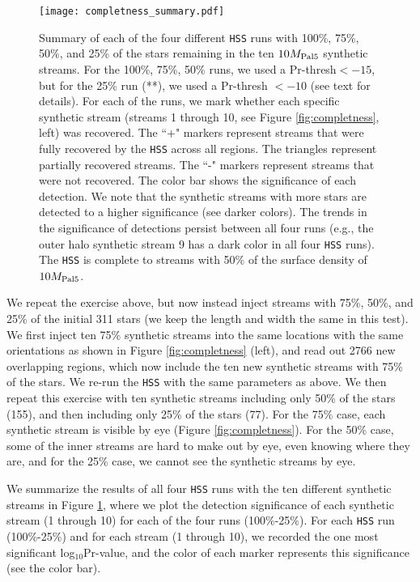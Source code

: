 \documentclass[twocolumn]{aastex631}
\begin{document}
\begin{figure}
\centerline{\texttt{[image: completness\_summary.pdf]}}
\caption{Summary of each of the four different \texttt{HSS} runs with 100\%, 75\%, 50\%, and 25\% of the stars remaining in the ten $10{M}_{\rm Pal 5}$ synthetic streams. For the 100\%, 75\%, 50\% runs, we used a Pr-thresh$<-15$, but for the 25\% run (**), we used a  Pr-thresh $<-10$ (see text for details). 
For each of the runs, we mark whether each specific synthetic stream (streams 1 through 10, see Figure \ref{fig:completness}, left) was recovered. The ``+" markers represent streams that were fully recovered by the \texttt{HSS} across all regions. The triangles represent partially recovered streams. The ``-" markers represent streams that were not recovered. The color bar shows the significance of each detection. 
We note that the synthetic streams with more stars are detected to a higher significance (see darker colors). The trends in the significance of detections persist between all four runs (e.g., the outer halo synthetic stream 9 has a dark color in all four \texttt{HSS} runs). The \texttt{HSS} is complete to streams with 50\% of the surface density of $10 {M}_{\rm Pal 5}$.
}
\label{fig:completness_summary}
\end{figure}
We repeat the exercise above, but now instead inject streams with 75\%, 50\%, and 25\% of the initial 311 stars (we keep the length and width the same in this test). We first inject ten 75\% synthetic  streams into the same locations with the same orientations as shown in  Figure \ref{fig:completness} (left), and read out 2766 new overlapping regions, which now include the ten new synthetic streams with 75\% of the stars. 
We re-run the \texttt{HSS} with the same parameters as above. We then repeat this exercise with ten synthetic streams including only 50\% of the stars (155), and then including only 25\% of the stars (77). For the 75\% case, each synthetic stream is visible by eye (Figure \ref{fig:completness}). For the 50\% case, some of the inner streams are hard to make out by eye, even knowing where they are, and for the 25\% case, we cannot see the synthetic streams by eye.


We summarize the results of all four \texttt{HSS} runs with the ten different synthetic streams in Figure \ref{fig:completness_summary}, where we plot the detection significance of each synthetic stream (1 through 10) for each of the four runs (100\%-25\%). For each \texttt{HSS} run (100\%-25\%) and for each stream (1 through 10), we recorded the one most significant log$_{10}$Pr-value, and the color of each marker represents this significance (see the color bar). 
\end{document}
